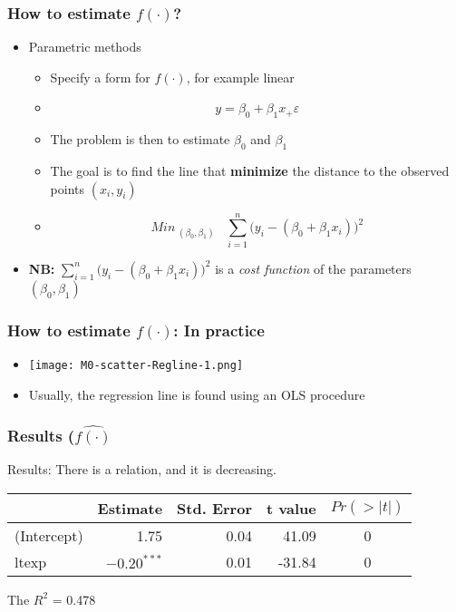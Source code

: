 \documentclass[xcolor=x11names,compress, aspectratio=169]{beamer}
\renewcommand{\(}{\begin{columns}}
\renewcommand{\)}{\end{columns}}
\newcommand{\<}[1]{\begin{column}{#1}}
\renewcommand{\>}{\end{column}}
\begin{document}
\begin{frame} %
\frametitle{How to estimate $f(\cdot)$?}
 \begin{itemize}
  \item<+-> Parametric methods
   \begin{itemize}
      \item<+->[] Specify a form for $f(\cdot)$, for example linear
      \item<+->[] $$y = \beta_0 + \beta_1 x_ + \varepsilon$$
      \item<+-> The problem is then to estimate $ \beta_0$ and $\beta_1$
      \item<+-> The goal is to find the line that \textbf{minimize} the distance to the observed points $(x_i, y_i)$
      \item<+->[] $$Min_{\; (\beta_0 , \beta_1)} \;  \; \; \sum_{i=1}^{n} \bigl(y_i - (\beta_0 + \beta_1 x_i)\bigr)^2$$
 \end{itemize}
 \item<+->[] \textbf{NB:} $\sum_{i=1}^{n} \bigl(y_i - (\beta_0 + \beta_1 x_i)\bigr)^2$ is a \textit{cost function} of the parameters $ (\beta_0,\beta_1)$
 \end{itemize}
\end{frame}



\begin{frame} %
\frametitle{How to estimate $f(\cdot)$: In practice}
 \begin{itemize}
  \item<+->[] \texttt{[image: M0-scatter-Regline-1.png]}
  \item<+->[] Usually, the regression line is found using an OLS procedure
 \end{itemize}
\end{frame}


\begin{frame} %
\frametitle{Results ($ \widehat{f(\cdot)}$}
Results:  There is a relation, and it is decreasing.
\begin{table}
\centering
\begin{tabular}{l|rrrc}
\hline
  & Estimate & Std. Error & t value & $Pr(>|t|)$\\
\hline
(Intercept) & 1.75 & 0.04 & 41.09 & 0\\
\hline
ltexp & $-0.20^{***}$ & 0.01 & -31.84 & 0\\
\hline
\end{tabular}
\end{table}
 The  $R^2$ = 0.478

\end{frame}
\end{document}
